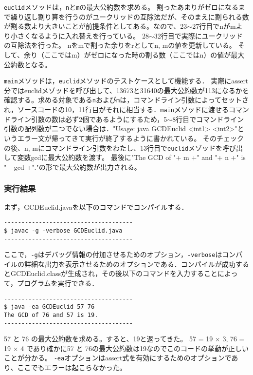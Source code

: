 \documentclass[10.5pt,a4paper]{jsarticle}
\begin{document}
\texttt{euclid}メソッドは，\texttt{n}と\texttt{m}の最大公約数を求める。
割ったあまりがゼロになるまで繰り返し割り算を行うのがユークリッドの互除法だが、そのまえに割られる数が割る数より大きいことが前提条件としてある。なので、23$\sim$27行目でnがmより小さくなるように入れ替えを行っている。
28$\sim$32行目で実際にユークリッドの互除法を行った。
nをmで割った余りをrとしてn, mの値を更新している。
そして、余り（ここではm）がゼロになった時の割る数（ここではn）の値が最大公約数となる。

\texttt{main}メソッドは，\texttt{euclid}メソッドのテストケースとして機能する．
実際にassert分ではeuclidメゾッドを呼び出して、13673と31640の最大公約数が113になるかを確認する。求める対象である\texttt{n}および\texttt{m}は，コマンドライン引数によってセットされ，ソースコードの10，11行目がそれに相当する．\texttt{main}メソッドに渡せるコマンドライン引数の数は必ず2個であるようにするため，5$\sim$8行目でコマンドライン引数の配列数が二つでない場合は．"Usage: java GCDEuclid <int1> <int2>"というエラー文が帰ってきて実行が終了するように書かれている。
そのチェックの後、n, mにコマンドライン引数をわたし、13行目で\texttt{euclid}メゾッドを呼び出して変数gcdに最大公約数を渡す。
最後に"The GCD of "+ m +" and "+ n +" is "+ gcd +"."の形で最大公約数が出力される。

\subsubsection{実行結果}\label{sec:ls_code_exec}

まず，GCDEuclid.javaを以下のコマンドでコンパイルする．
\begin{verbatim}
-------------------------------------
$ javac -g -verbose GCDEuclid.java
-------------------------------------
\end{verbatim}
ここで，\texttt{-g}はデバッグ情報の付加させるためのオプション，\texttt{-verbose}はコンパイルの詳細な出力を表示させるためのオプションである．コンパイルが成功するとGCDEuclid.classが生成され，その後以下のコマンドを入力することによって，プログラムを実行できる．
\begin{verbatim}
-------------------------------------
$ java -ea GCDEuclid 57 76
The GCD of 76 and 57 is 19.
-------------------------------------
\end{verbatim}

57 と 76 の最大公約数を求める。すると、19と返ってきた。
57 = 19 × 3, 
76 = 19 × 4
であり確かに57 と 76の最大公約数は19なのでこのコードの挙動が正しいことが分かる。
\texttt{-ea}オプションはassert式を有効にするためのオプションであり、ここでもエラーは起こらなかった。
\end{document}
